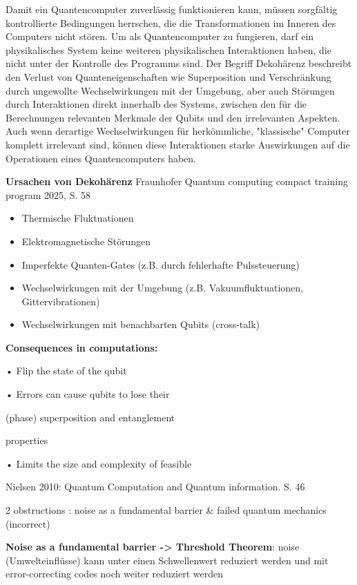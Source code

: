Damit ein Quantencomputer zuverlässig funktionieren kann, müssen sorgfältig kontrollierte Bedingungen herrschen, die die Transformationen im Inneren des Computers nicht stören. Um als Quantencomputer zu fungieren, darf ein physikalisches System keine weiteren physikalischen Interaktionen haben, die nicht unter der Kontrolle des Programms sind. Der Begriff Dekohärenz beschreibt den Verlust von Quanteneigenschaften wie Superposition und Verschränkung durch ungewollte Wechselwirkungen mit der Umgebung, aber auch Störungen durch Interaktionen direkt innerhalb des Systems, zwischen den für die Berechnungen relevanten Merkmale der Qubits und den irrelevanten Aspekten. 
Auch wenn derartige Wechselwirkungen für herkömmliche, "klassische" Computer komplett irrelevant sind, können diese Interaktionen starke Auswirkungen auf die Operationen eines Quantencomputers haben. 
\cite{mermin_quantum_2012}

\textbf{Ursachen von Dekohärenz}
Fraunhofer Quantum computing compact training program 2025, S. 58 


\begin{itemize}
    \item Thermische Fluktuationen
    \item Elektromagnetische Störungen
    \item Imperfekte Quanten-Gates (z.B. durch fehlerhafte Pulssteuerung)
    \item Wechselwirkungen mit der Umgebung (z.B. Vakuumfluktuationen, Gittervibrationen)
    \item Wechselwirkungen mit benachbarten Qubits (cross-talk)
\end{itemize}
\cite{fraunhofer_iais_quantum_2023}
\cite{mermin_quantum_2012}



\textbf{Consequences in computations:} 

• Flip the state of the qubit 

• Errors can cause qubits to lose their 

(phase) superposition and entanglement 

properties 

• Limits the size and complexity of feasible 


 

Nielsen 2010: Quantum Computation and Quantum information. S. 46 

2 obstructions : noise as a fundamental barrier \& failed quantum mechanics (incorrect) 

\textbf{Noise as a fundamental barrier -> Threshold Theorem}: noise (Umwelteinflüsse) kann unter einen Schwellenwert reduziert werden und mit error-correcting codes noch weiter reduziert werden 

